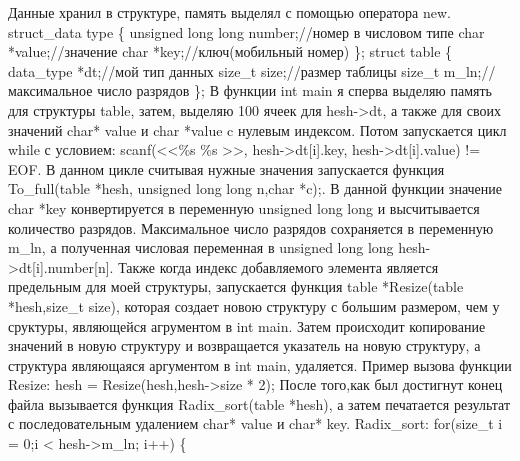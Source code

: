 \documentclass[12pt]{article}
\begin{document}
 Данные хранил в структуре, память выделял с помощью оператора new.\newline
struct\_data type \{ \newline
\indent unsigned long long number;//номер в числовом типе \newline
\indent char *value;//значение \newline
\indent char *key;//ключ(мобильный номер) \newline
\}; \newline
struct table \{ \newline
\indent data\_type *dt;//мой тип данных \newline
\indent size\_t size;//размер таблицы \newline
\indent size\_t m\_ln;//максимальное число разрядов \newline
\}; \newline
В функции int main я сперва выделяю память для структуры table, затем, выделяю 100 ячеек для hesh->dt, а также для своих значений char* value и char *value c нулевым индексом. Потом запускается цикл while с условием: scanf(<<\%s \%s >>, hesh->dt[i].key, hesh->dt[i].value) != EOF.\newline
В данном цикле считывая нужные значения запускается функция To\_full(table *hesh, unsigned long long n,char *c);. В данной функции значение char *key конвертируется в переменную unsigned long long и высчитывается количество разрядов. Максимальное число разрядов сохраняется в переменную m\_ln, а полученная числовая переменная в unsigned long long hesh->dt[i].number[n]. \newline
 Также когда индекс добавляемого элемента является предельным для моей структуры, запускается функция table *Resize(table *hesh,size\_t size), которая создает новою структуру с большим размером, чем у сруктуры, являющейся агрументом в int main. Затем происходит копирование значений в новую структуру и возвращается указатель на новую структуру, а структура являющаяся аргументом в int main, удаляется.\newline
\indent Пример вызова функции Resize: hesh = Resize(hesh,hesh->size * 2); \newline
После того,как был достигнут конец файла вызывается функция Radix\_sort(table *hesh), а затем печатается результат с последовательным удалением char* value и char* key.\newline
Radix\_sort:\newline
for(size\_t i = 0;i < hesh->m\_ln; i++) \{ \newline
\end{document}

